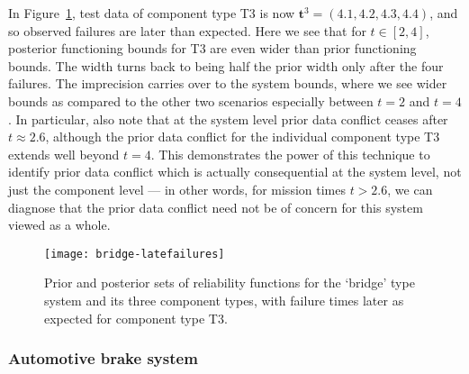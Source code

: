 \documentclass[12pt, a4paper]{elsarticle}
\newcommand{\bs}[1]{\boldsymbol{#1}}
\renewcommand{\vec}[1]{{\bs#1}}
\begin{document}
In Figure~\ref{fig:bridge-late}, 
test data of component type T3 is now $\vec{t}^3 = (4.1, 4.2, 4.3, 4.4)$,
and so observed failures are later than expected.
Here we see that for $t \in [2,4]$,
posterior functioning bounds for T3 are even wider than prior functioning bounds.
The width turns back to being half the prior width
only after the four failures.
The imprecision carries over to the system bounds,
where we see wider bounds as compared to the other two scenarios
especially between $t=2$ and $t=4$.  In particular, also note
that at the system level prior data conflict ceases after
$t \approx 2.6$, although the prior data conflict for the 
individual component type T3 extends well beyond $t=4$.  This 
demonstrates the power of this technique to identify prior
data conflict which is actually consequential at the system 
level, not just the component level --- in other words, for 
mission times $t>2.6$, we can diagnose that the prior data conflict 
need not be of concern for this system viewed as a whole.

\begin{figure}
\texttt{[image: bridge-latefailures]}
\caption{Prior and posterior sets of reliability functions for the `bridge' type system and its three component types,
with failure times later as expected for component type T3.}
\label{fig:bridge-late}
\end{figure}

\subsubsection{Automotive brake system}
\end{document}

